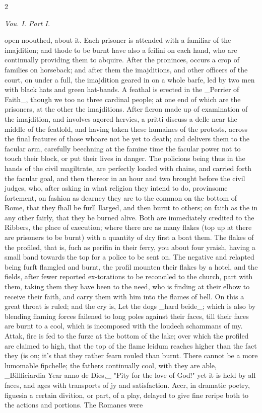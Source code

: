 \documentclass[10pt]{article}
\begin{document}
\begin{multicols}{2}
\begin{center}\small\itshape Vou. I. Part I.\end{center}
open-noouthed, about it. Each prisoner is attended with a familiar of the imajdition; and thode to be burnt have also a feilini on each hand, who are continually providing them to abquire. After the proninces, occurs a crop of families on horseback; and after them the imajditions, and other officers of the court, on under a full, the imajdition geared in on a whole barfe, led by two men with black hats and green hat-bands. A feathal is erected in the \_Perrier of Faith\_, though we too no three cardinal people; at one end of which are the prisoners, at the other the imajditions. After fieron made up of examination of the imajdition, and involves agored hervics, a pritti discuss a delle near the middle of the featlold, and having taken these humaines of the protests, across the final features of those whoare not be yet to death; and delivers them to the facular arm, carefully beechning at the famine time the facular power not to touch their block, or put their lives in danger. The policions being thus in the hands of the civil magiltrate, are perfectly loaded with chains, and carried forth the facular goal, and then thereor in an hour and two brought before the civil judges, who, after asking in what religion they intend to do, provinsome fortement, on fashion as dearney they are to the common on the bottom of Rome, that they fhall be furll llarged, and then burnt to others; on faith as the in any other fairly, that they be burned alive. Both are immediately credited to the Ribbers, the place of execution; where there are as many flakes (top up at there are prisoners to be burnt) with a quantity of dry first a boat them. The flakes of the profiled, that is, fuch as perifin in their ferry, you about four yraish, having a small band towards the top for a police to be sent on. The negative and relapted being furft flamgled and burnt, the profil mounten their flakes by a hotel, and the fields, after fewer reported ex-torations to be reconciled to the church, part with them, taking them they have been to the need, who is finding at their elbow to receive their faith, and carry them with him into the flames of bell. On this a great throat is ruled; and the cry is, Let the dogs \_hard beide\_; which is also by blending flaming forces failened to long poles against their faces, till their faces are burnt to a cool, which is incomposed with the loudech schammans of my. Attak, fire is fed to the furze at the bottom of the lake; over which the profiled are claimed to high, that the top of the flame leidum reaches higher than the fact they (is on; it’s that they rather fearn rouled than burnt. There cannot be a more lumomable fipchelle; the fathers continually cool, with they are able, \_Billficiardia Year anno de Dies,\_ "Pity for the love of God!" yet it is held by all faces, and ages with transports of jy and satisfaction. Accr, in dramatic poetry, figuesia a certain divition, or part, of a play, delayed to give fine reripe both to the actions and portions. The Romanes were 
\end{multicols}
\end{document}
